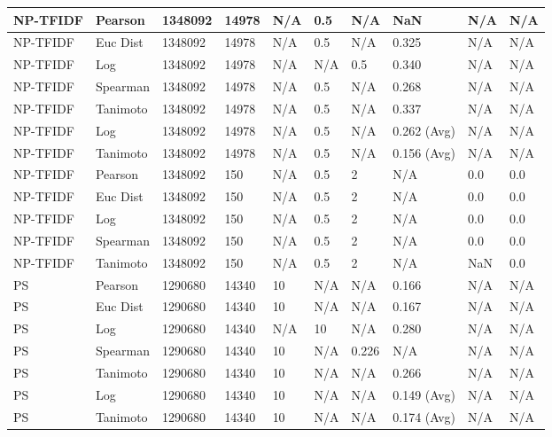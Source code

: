 \documentclass{article}
\begin{document}
\begin{longtable}{ |p{1.7cm}|p{1.9cm}|p{1.5cm}|p{1.5cm}|p{0.75cm}|p{0.75cm}|p{0.75cm}|p{0.75cm}|p{1.5cm}|p{1.5cm}|}
    NP-TFIDF & Pearson & 1348092 & 14978 & N/A & 0.5 & N/A & NaN & N/A & N/A  \\ \hline
    NP-TFIDF  & Euc Dist & 1348092 & 14978 & N/A & 0.5 & N/A & 0.325 & N/A & N/A   \\ \hline
    NP-TFIDF  & Log & 1348092 & 14978 & N/A &  N/A & 0.5 & 0.340 & N/A & N/A  \\ \hline
    NP-TFIDF  & Spearman & 1348092 & 14978 & N/A & 0.5 & N/A & 0.268 & N/A & N/A \\ \hline
    NP-TFIDF  & Tanimoto & 1348092 & 14978 & N/A & 0.5 & N/A & 0.337 & N/A & N/A \\ \hline
    NP-TFIDF  & Log & 1348092 & 14978 & N/A & 0.5 & N/A & 0.262 (Avg) & N/A & N/A \\ \hline
    NP-TFIDF  & Tanimoto & 1348092 & 14978 & N/A & 0.5 & N/A & 0.156 (Avg) & N/A & N/A \\ \hline
    
    NP-TFIDF  & Pearson & 1348092 & 150 & N/A & 0.5 & 2 & N/A & 0.0 & 0.0  \\ \hline
    NP-TFIDF  & Euc Dist & 1348092 & 150 & N/A & 0.5 & 2 & N/A &0.0 & 0.0   \\ \hline
    NP-TFIDF  & Log & 1348092 & 150 & N/A & 0.5 & 2 & N/A & 0.0 & 0.0  \\ \hline
    NP-TFIDF  & Spearman & 1348092 & 150 & N/A & 0.5 & 2 & N/A &0.0 & 0.0 \\ \hline
    NP-TFIDF  & Tanimoto & 1348092 & 150 & N/A & 0.5 & 2 & N/A & NaN & 0.0 \\ \hline
    
    PS & Pearson & 1290680 & 14340 & 10 & N/A & N/A & 0.166 & N/A & N/A  \\ \hline
    PS  & Euc Dist & 1290680 & 14340 & 10 & N/A & N/A & 0.167 & N/A & N/A   \\ \hline
    PS & Log & 1290680 & 14340 & N/A &  10 & N/A& 0.280 & N/A & N/A  \\ \hline
    PS & Spearman & 1290680 & 14340 & 10 & N/A & 0.226 & N/A & N/A & N/A \\ \hline
    PS & Tanimoto & 1290680 & 14340 & 10 & N/A& N/A & 0.266 & N/A & N/A \\ \hline
    PS & Log & 1290680 & 14340 & 10 & N/A& N/A & 0.149 (Avg) & N/A & N/A \\ \hline
    PS & Tanimoto & 1290680 & 14340 & 10 & N/A & N/A & 0.174 (Avg) & N/A & N/A \\ \hline
    

\end{longtable}
\end{document}
